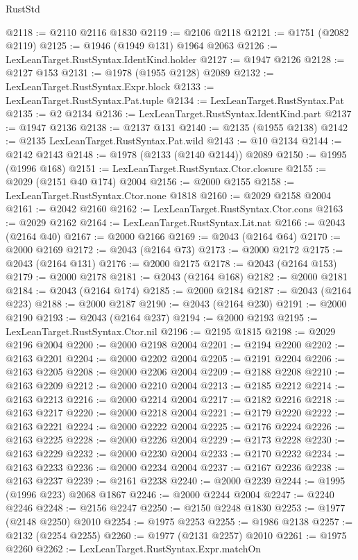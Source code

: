 \begin{lexlean}{RustStd}
\begin{coremodule}
@2118 := @2110 @2116 @1830
@2119 := @2106 @2118
@2121 := @1751 (@2082 @2119)
@2125 := @1946 (@1949 @131) @1964 @2063
@2126 := LexLeanTarget.RustSyntax.IdentKind.holder
@2127 := @1947 @2126
@2128 := @2127 @153
@2131 := @1978 (@1955 @2128) @2089
@2132 := LexLeanTarget.RustSyntax.Expr.block
@2133 := LexLeanTarget.RustSyntax.Pat.tuple
@2134 := LexLeanTarget.RustSyntax.Pat
@2135 := @2 @2134
@2136 := LexLeanTarget.RustSyntax.IdentKind.part
@2137 := @1947 @2136
@2138 := @2137 @131
@2140 := @2135 (@1955 @2138)
@2142 := @2135 LexLeanTarget.RustSyntax.Pat.wild
@2143 := @10 @2134
@2144 := @2142 @2143
@2148 := @1978 (@2133 (@2140 @2144)) @2089
@2150 := @1995 (@1996 @168)
@2151 := LexLeanTarget.RustSyntax.Ctor.closure
@2155 := @2029 (@2151 @40 @174) @2004
@2156 := @2000 @2155
@2158 := LexLeanTarget.RustSyntax.Ctor.none @1818
@2160 := @2029 @2158 @2004
@2161 := @2042 @2160
@2162 := LexLeanTarget.RustSyntax.Ctor.cons
@2163 := @2029 @2162
@2164 := LexLeanTarget.RustSyntax.Lit.nat
@2166 := @2043 (@2164 @40)
@2167 := @2000 @2166
@2169 := @2043 (@2164 @64)
@2170 := @2000 @2169
@2172 := @2043 (@2164 @73)
@2173 := @2000 @2172
@2175 := @2043 (@2164 @131)
@2176 := @2000 @2175
@2178 := @2043 (@2164 @153)
@2179 := @2000 @2178
@2181 := @2043 (@2164 @168)
@2182 := @2000 @2181
@2184 := @2043 (@2164 @174)
@2185 := @2000 @2184
@2187 := @2043 (@2164 @223)
@2188 := @2000 @2187
@2190 := @2043 (@2164 @230)
@2191 := @2000 @2190
@2193 := @2043 (@2164 @237)
@2194 := @2000 @2193
@2195 := LexLeanTarget.RustSyntax.Ctor.nil
@2196 := @2195 @1815
@2198 := @2029 @2196 @2004
@2200 := @2000 @2198 @2004
@2201 := @2194 @2200
@2202 := @2163 @2201
@2204 := @2000 @2202 @2004
@2205 := @2191 @2204
@2206 := @2163 @2205
@2208 := @2000 @2206 @2004
@2209 := @2188 @2208
@2210 := @2163 @2209
@2212 := @2000 @2210 @2004
@2213 := @2185 @2212
@2214 := @2163 @2213
@2216 := @2000 @2214 @2004
@2217 := @2182 @2216
@2218 := @2163 @2217
@2220 := @2000 @2218 @2004
@2221 := @2179 @2220
@2222 := @2163 @2221
@2224 := @2000 @2222 @2004
@2225 := @2176 @2224
@2226 := @2163 @2225
@2228 := @2000 @2226 @2004
@2229 := @2173 @2228
@2230 := @2163 @2229
@2232 := @2000 @2230 @2004
@2233 := @2170 @2232
@2234 := @2163 @2233
@2236 := @2000 @2234 @2004
@2237 := @2167 @2236
@2238 := @2163 @2237
@2239 := @2161 @2238
@2240 := @2000 @2239
@2244 := @1995 (@1996 @223) @2068 @1867
@2246 := @2000 @2244 @2004
@2247 := @2240 @2246
@2248 := @2156 @2247
@2250 := @2150 @2248 @1830
@2253 := @1977 (@2148 @2250) @2010
@2254 := @1975 @2253
@2255 := @1986 @2138
@2257 := @2132 (@2254 @2255)
@2260 := @1977 (@2131 @2257) @2010
@2261 := @1975 @2260
@2262 := LexLeanTarget.RustSyntax.Expr.matchOn

\end{coremodule}
\end{lexlean}
